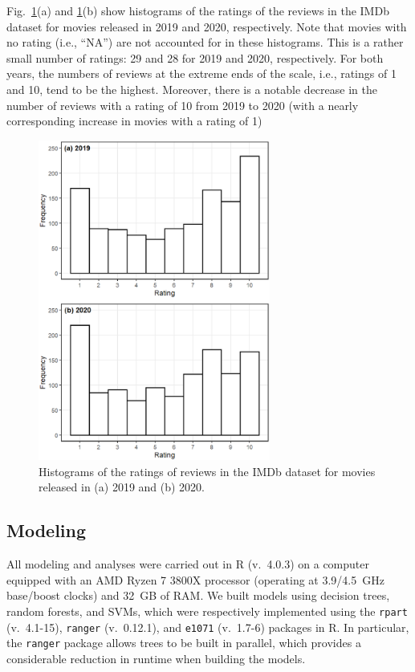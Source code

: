 \documentclass[conference]{IEEEtran}
\begin{document}
Fig.~\ref{fig:Histograms}(a) and \ref{fig:Histograms}(b) show histograms of the ratings of the reviews in the IMDb dataset for movies released in 2019 and 2020, respectively. Note that movies with no rating (i.e., ``NA'') are not accounted for in these histograms. This is a rather small number of ratings: 29 and 28 for 2019 and 2020, respectively. For both years, the numbers of reviews at the extreme ends of the scale, i.e., ratings of 1 and 10, tend to be the highest. Moreover, there is a notable decrease in the number of reviews with a rating of 10 from 2019 to 2020 (with a nearly corresponding increase in movies with a rating of 1)

\begin{figure}[tbp]
    \centerline{\includegraphics[width=3in]{figures/IMDbHist.eps}}
    \caption{Histograms of the ratings of reviews in the IMDb dataset for movies released in (a) 2019 and (b) 2020.}
    \label{fig:Histograms}
\end{figure}

\subsection{Modeling}\label{sec:Modeling}
All modeling and analyses were carried out in R (v.~4.0.3) on a computer equipped with an AMD Ryzen 7 3800X processor (operating at 3.9/4.5~GHz base/boost clocks) and 32~GB of RAM. We built models using decision trees, random forests, and SVMs, which were respectively implemented using the \verb|rpart| (v.~4.1-15), \verb|ranger| (v.~0.12.1), and \verb|e1071| (v.~1.7-6) packages in R. In particular, the \verb|ranger| package allows trees to be built in parallel, which provides a considerable reduction in runtime when building the models.
\end{document}
